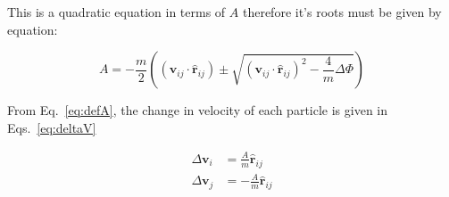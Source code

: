 \documentclass[12pt]{UoAthesis} \usepackage{booktabs}
\begin{document}
This is a quadratic equation in terms of $A$ therefore it's roots must
be given by equation:

\begin{equation}
  \label{eq:devQuadratic}
  A = -\frac{m}{2}\left((\mathbf{v}_{ij}\cdot\mathbf{\hat{r}}_{ij}) \pm
  \sqrt{(\mathbf{v}_{ij}\cdot\mathbf{\hat{r}}_{ij})^2 - \frac{4}{m}\Delta \Phi}\right)
\end{equation}  

From Eq.~\eqref{eq:defA}, the change in velocity of each particle
is given in Eqs.~\eqref{eq:deltaV}

\begin{subequations}
  \label{eq:deltaV}
  \begin{align}
    \Delta\mathbf{v}_i &= \frac{A}{m} \mathbf{\hat{r}}_{ij} \\
    \Delta\mathbf{v}_j &= -\frac{A}{m}\mathbf{\hat{r}}_{ij}    
  \end{align}
\end{subequations}

\printbibliography[heading=thesisChapterBib] 
 
\end{document}
